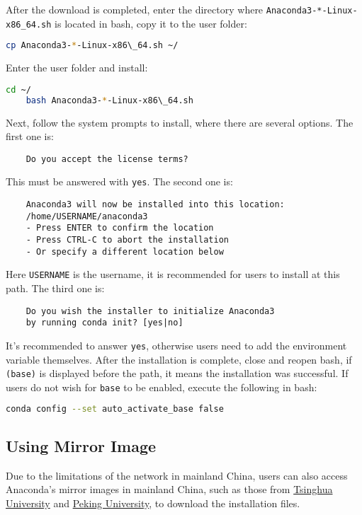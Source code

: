 \documentclass{report}
\begin{document}
After the download is completed, enter the directory where \texttt{Anaconda3-*-Linux-x86\_64.sh} is located in \textsf{bash}, copy it to the user folder:
\begin{lstlisting}[language=bash]
	cp Anaconda3-*-Linux-x86\_64.sh ~/
\end{lstlisting}
Enter the user folder and install:
\begin{lstlisting}[language=bash]
	cd ~/
	bash Anaconda3-*-Linux-x86\_64.sh
\end{lstlisting}
Next, follow the system prompts to install, where there are several options. The first one is:
\begin{lstlisting}
	Do you accept the license terms?
\end{lstlisting}
This must be answered with \texttt{yes}. The second one is:
\begin{lstlisting}
	Anaconda3 will now be installed into this location:
	/home/USERNAME/anaconda3
	- Press ENTER to confirm the location
	- Press CTRL-C to abort the installation
	- Or specify a different location below
\end{lstlisting}
Here \texttt{USERNAME} is the username, it is recommended for users to install at this path. The third one is:
\begin{lstlisting}
	Do you wish the installer to initialize Anaconda3
	by running conda init? [yes|no]
\end{lstlisting}
It's recommended to answer \texttt{yes}, otherwise users need to add the environment variable themselves. After the installation is complete, close and reopen \textsf{bash}, if \texttt{(base)} is displayed before the path, it means the installation was successful. If users do not wish for \texttt{base} to be enabled, execute the following in \textsf{bash}:
\begin{lstlisting}[language=bash]
	conda config --set auto_activate_base false
\end{lstlisting}

\subsection{Using Mirror Image}

Due to the limitations of the network in mainland China, users can also access Anaconda's mirror images in mainland China, such as those from \href{https://mirrors.tuna.tsinghua.edu.cn/anaconda/archive/}{Tsinghua University} and \href{https://mirrors.pku.edu.cn/anaconda/archive/}{Peking University}, to download the installation files.
\end{document}
